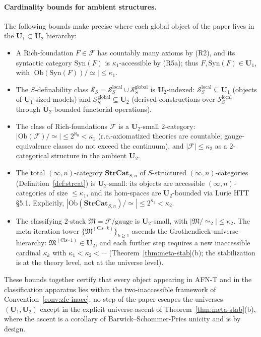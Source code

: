 \documentclass[11pt]{article}
\theoremstyle{plain}
\theoremstyle{definition}
\newcommand{\cS}{\mathcal{S}}
\newcommand{\cF}{\mathcal{F}}
\newcommand{\fM}{\mathfrak{M}}
\newcommand{\Ob}{\mathrm{Ob}}
\newcommand{\Syn}{\mathrm{Syn}}
\begin{document}
\paragraph{Cardinality bounds for ambient structures.}
The following bounds make precise where each global object of the paper lives in the $\mathbf{U}_1 \subset \mathbf{U}_2$ hierarchy:
\begin{itemize}
\item A Rich-foundation $F \in \cF$ has countably many axioms by (R2), and its syntactic category $\Syn(F)$ is $\kappa_1$-accessible by (R5a); thus $F, \Syn(F) \in \mathbf{U}_1$, with $|\Ob(\Syn(F))/\!\simeq| \leq \kappa_1$.
\item The $S$-definability class $\cS_S = \cS_S^{\mathrm{local}} \cup \cS_S^{\mathrm{global}}$ is $\mathbf{U}_2$-indexed: $\cS_S^{\mathrm{local}} \subseteq \mathbf{U}_1$ (objects of $\mathbf{U}_1$-sized models) and $\cS_S^{\mathrm{global}} \subseteq \mathbf{U}_2$ (derived constructions over $\cS_S^{\mathrm{local}}$ through $\mathbf{U}_2$-bounded functorial operations).
\item The class of Rich-foundations $\cF$ is a $\mathbf{U}_2$-small $2$-category: $|\Ob(\cF)/\!\simeq| \leq 2^{\aleph_0} < \kappa_1$ (r.e.-axiomatized theories are countable; gauge-equivalence classes do not exceed the continuum), and $|\cF| \leq \kappa_2$ as a $2$-categorical structure in the ambient $\mathbf{U}_2$.
\item The total $(\infty, n)$-category $\mathbf{StrCat}_{S, n}$ of $S$-structured $(\infty, n)$-categories (Definition~\ref{def:strcat}) is $\mathbf{U}_2$-small: its objects are accessible $(\infty, n)$-categories of size $\leq \kappa_1$, and its hom-spaces are $\mathbf{U}_2$-bounded via Lurie HTT~\cite{LurieHTT} \S 5.1. Explicitly, $|\Ob(\mathbf{StrCat}_{S, n})/\!\simeq| \leq 2^{\kappa_1} < \kappa_2$.
\item The classifying $2$-stack $\fM = \cF / \mathrm{gauge}$ is $\mathbf{U}_2$-small, with $|\fM / \!\simeq_2| \leq \kappa_2$. The meta-iteration tower $\{\fM^{(\mathrm{Cls}\cdot k)}\}_{k \geq 1}$ ascends the Grothendieck-universe hierarchy: $\fM^{(\mathrm{Cls}\cdot 1)} \in \mathbf{U}_2$, and each further step requires a new inaccessible cardinal $\kappa_k$ with $\kappa_1 < \kappa_2 < \cdots$ (Theorem~\ref{thm:meta-stab}(b); the stabilization is at the theory level, not at the universe level).
\end{itemize}
These bounds together certify that every object appearing in AFN-T and in the classification apparatus lies within the two-inaccessible framework of Convention~\ref{conv:zfc-inacc}; no step of the paper escapes the universes $(\mathbf{U}_1, \mathbf{U}_2)$ except in the explicit universe-ascent of Theorem~\ref{thm:meta-stab}(b), where the ascent is a corollary of Barwick--Schommer-Pries unicity and is by design.
\end{document}
